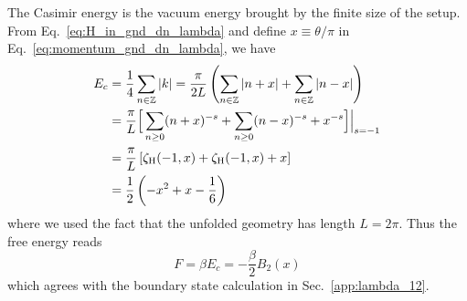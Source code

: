 The Casimir energy is the vacuum energy brought by the finite size of the setup. From Eq.~\eqref{eq:H_in_gnd_dn_lambda} and define $x\equiv\theta/\pi$ in Eq.~\eqref{eq:momentum_gnd_dn_lambda}, we have
\begin{equation}
\begin{aligned}
E_c &= \frac{1}{4} \sum_{n \in \mathbb{Z}} | k| = \frac{\pi}{2L} \left( \sum_{n \in \mathbb{Z}}  | n + x | + \sum_{n \in \mathbb{Z}}  | n - x |  \right) \\  
&= \frac{\pi}{L} \Big[\sum_{n \ge 0 } ( n + x )^{-s} + \sum_{n \ge 0 }  ( n - x)^{-s}  +   x^{-s} \Big]\Big|_{s = -1} \\
&= \frac{\pi}{L} \left[ \zeta_{\rm H}( -1, x ) + \zeta_{\rm H}( -1, x ) +  x \right] \\
&= \frac{1}{2} \left( - x^2 + x - \frac{1}{6}\right)
\end{aligned}
\end{equation}
where we used the fact that the unfolded geometry has length $L=2\pi$. Thus the free energy reads
\begin{equation}
F = \beta E_c = - \frac{\beta}{2} B_2( x) 
\end{equation}
which agrees with the boundary state calculation in Sec.~\ref{app:lambda_12}. 

